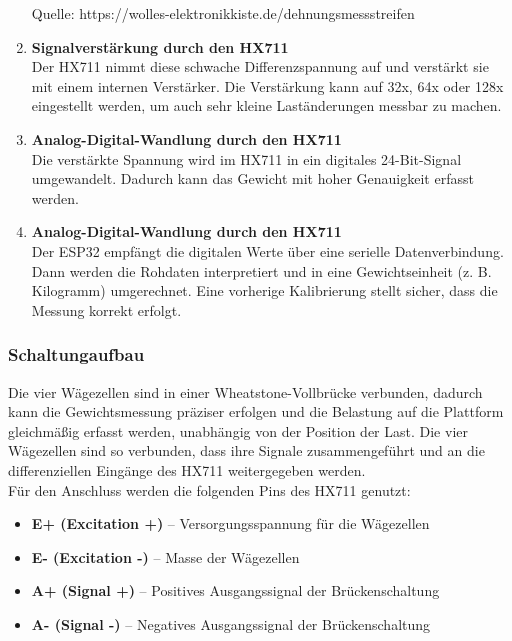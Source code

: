 \documentclass[ngerman,12pt,a4paper]{article}
\begin{document}
\begin{enumerate}
\begin{center}
\begin{minipage}{0.9\textwidth}
					\label{fig:wheatstone}
					\vspace{-3pt}
					{\small Quelle: {https://wolles-elektronikkiste.de/dehnungsmessstreifen}}
				\end{minipage}
			\end{center}
			\vspace{5pt}
			
			\item \textbf{Signalverstärkung durch den HX711} \\
			Der HX711 nimmt diese schwache Differenzspannung auf und verstärkt sie mit einem internen Verstärker. Die Verstärkung kann auf 32x, 64x oder 128x eingestellt werden, um auch sehr kleine Laständerungen messbar zu machen.
			
			\item \textbf{Analog-Digital-Wandlung durch den HX711} \\
			Die verstärkte Spannung wird im HX711 in ein digitales 24-Bit-Signal umgewandelt. Dadurch kann das Gewicht mit hoher Genauigkeit erfasst werden.
			
			\item \textbf{Analog-Digital-Wandlung durch den HX711} \\
			Der ESP32 empfängt die digitalen Werte über eine serielle Datenverbindung. Dann werden die Rohdaten interpretiert und in eine Gewichtseinheit (z. B. Kilogramm) umgerechnet. Eine vorherige Kalibrierung stellt sicher, dass die Messung korrekt erfolgt.
		\end{enumerate}
		\newpage
		\subsubsection{Schaltungaufbau}
		Die vier Wägezellen sind in einer Wheatstone-Vollbrücke verbunden, dadurch kann die Gewichtsmessung präziser erfolgen und die Belastung auf die Plattform gleichmäßig erfasst werden, unabhängig von der Position der Last. Die vier Wägezellen sind so verbunden, dass ihre Signale zusammengeführt und an die differenziellen Eingänge des HX711 weitergegeben werden. \\[0.5cm]
		Für den Anschluss werden die folgenden Pins des HX711 genutzt:
		\begin{itemize}
			\item \textbf{E+ (Excitation +)} – Versorgungsspannung für die Wägezellen
			\item \textbf{E- (Excitation -)} – Masse der Wägezellen
			\item \textbf{A+ (Signal +)} – Positives Ausgangssignal der Brückenschaltung
			\item \textbf{A- (Signal -)} – Negatives Ausgangssignal der Brückenschaltung
		\end{itemize}
		
\end{document}
